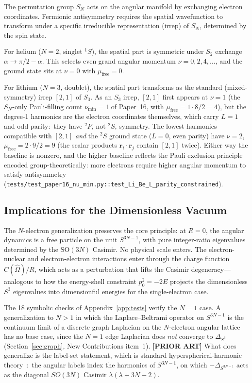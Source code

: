 \documentclass[aps,pra,twocolumn,superscriptaddress,longbibliography]{revtex4-2}
\begin{document}
The permutation group $S_N$ acts on the angular manifold by
exchanging electron coordinates.  Fermionic antisymmetry requires
the spatial wavefunction to transform under a specific irreducible
representation (irrep) of $S_N$, determined by the spin state.

For helium ($N = 2$, singlet ${}^1S$), the spatial part is
symmetric under $S_2$ exchange $\alpha \to \pi/2 - \alpha$.
This selects even grand angular momentum $\nu = 0, 2, 4, \ldots$,
and the ground state sits at $\nu = 0$ with $\mu_{\mathrm{free}} = 0$.

For lithium ($N = 3$, doublet), the spatial part transforms
as the standard (mixed-symmetry) irrep $[2,1]$ of $S_3$.  As an
$S_3$ irrep, $[2,1]$ first appears at $\nu = 1$ (the $S_N$-only
Pauli-filling count $\nu_{\min} = 1$ of Paper~16, with
$\mu_{\mathrm{free}} = 1 \cdot 8/2 = 4$), but the degree-1 harmonics are the electron coordinates
themselves, which carry $L = 1$ and odd parity:\ they have ${}^2P$, not
${}^2S$, symmetry.  The lowest harmonics compatible with $[2,1]$
\emph{and} the ${}^2S$ ground state ($L = 0$, even parity) have
$\nu = 2$, $\mu_{\mathrm{free}} = 2 \cdot 9/2 = 9$ (the scalar products
$\mathbf{r}_i\cdot\mathbf{r}_j$ contain $[2,1]$ twice).  Either way
the baseline is nonzero, and the higher baseline reflects the Pauli
exclusion principle encoded group-theoretically: more electrons
require higher angular momentum to satisfy antisymmetry
(\texttt{tests/test\_paper16\_nu\_min.py::test\_Li\_Be\_L\_parity\_constrained}).

\subsection{Implications for the Dimensionless Vacuum}

The $N$-electron generalization preserves the core principle: at
$R = 0$, the angular dynamics is a free particle on the unit
$S^{3N-1}$, with pure integer-ratio eigenvalues determined by
the $\mathrm{SO}(3N)$ Casimir.  No physical scale enters.  The
electron-nuclear and electron-electron interactions enter through
the charge function $C(\hat{\Omega})/R$, which acts as a
perturbation that lifts the Casimir degeneracy---analogous to how
the energy-shell constraint $p_0^2 = -2E$ projects the dimensionless
$S^3$ eigenvalues into dimensionful energies for the single-electron
case.

The 18 symbolic checks of Appendix~\ref{app:tests} verify the
$N = 1$ case.  A generalization to $N > 1$ in which the Laplace--Beltrami
operator on $S^{3N-1}$ is the continuum limit of a discrete graph
Laplacian on the $N$-electron angular lattice has no base case, since the
$N = 1$ edge Laplacian does \emph{not} converge to $\Delta_{S^3}$
(Section~\ref{sec:graph}, New Contributions item~1).
\textbf{[PRIOR ART]} What does generalize is the label-set
statement, which is standard hyperspherical-harmonic
theory~\cite{avery1989}:\ the
angular labels index the harmonics of $S^{3N-1}$, on which
$-\Delta_{S^{3N-1}}$ acts as the diagonal $SO(3N)$ Casimir
$\lambda(\lambda + 3N - 2)$.
\end{document}
